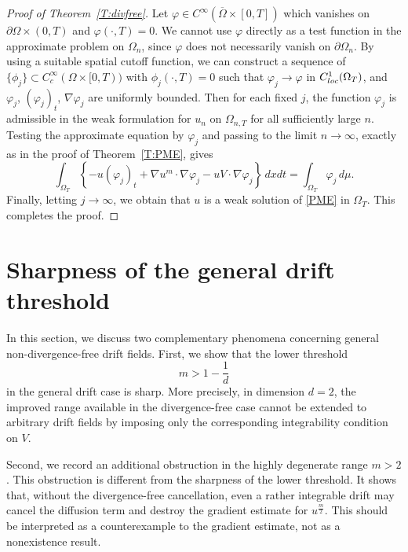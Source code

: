 \documentclass{amsart}
\numberwithin{equation}{section}
\begin{document}
\begin{proof}[Proof of Theorem~\ref{T:divfree}]
Let $\varphi \in C^{\infty} \left(\overline{\Omega} \times [0, T]\right)$ which vanishes on $\partial \Omega \times (0,T)$ and $\varphi(\cdot,T)=0$. 
We cannot use $\varphi$ directly as a test function in the approximate
problem on $\Omega_n$, since $\varphi$ does not necessarily vanish on
$\partial\Omega_n$. By using a suitable spatial cutoff function, we can construct a sequence of $\{\phi_j\} \subset C_c^\infty(\Omega\times[0,T))$ with $\phi_j(\cdot,T)=0$ such that $\varphi_j\to\varphi$ in $C^1_{\rm loc}(\Omega_T)$, and
$\varphi_j$, $(\varphi_j)_t$, $\nabla\varphi_j$ are uniformly bounded. Then for each fixed $j$, the function
$\varphi_j$ is admissible in the weak formulation for $u_n$ on
$\Omega_{n,T}$ for all sufficiently large $n$.
Testing the approximate equation by $\varphi_j$ and passing to the limit
$n\to\infty$, exactly as in the proof of Theorem~\ref{T:PME}, gives
\[
\int_{\Omega_T}
\left\{
-u(\varphi_j)_t+\nabla u^m\cdot\nabla\varphi_j
-uV\cdot\nabla\varphi_j
\right\}\,dxdt
=
\int_{\Omega_T}\varphi_j\,d\mu .
\]
Finally, letting $j\to\infty$, we obtain that $u$ is a weak solution of \eqref{PME} in $\Omega_T$. This completes the proof.
\end{proof}











\section{Sharpness of the general drift threshold}
\label{S:sharpness-divfree}



In this section, we discuss two complementary phenomena concerning general
non-divergence-free drift fields. First, we show that the lower threshold
\[
m>1-\frac{1}{d}
\]
in the general drift case is sharp. More precisely, in dimension \(d=2\),
the improved range available in the divergence-free case cannot be extended
to arbitrary drift fields by imposing only the corresponding integrability
condition on \(V\).

Second, we record an additional obstruction in the highly degenerate range
\(m>2\). This obstruction is different from the sharpness of the lower
threshold. It shows that, without the divergence-free cancellation, even a
rather integrable drift may cancel the diffusion term and destroy the
gradient estimate for \(u^{\frac{m}{2}}\). This should be interpreted as a
counterexample to the gradient estimate, not as a nonexistence result.
\end{document}
